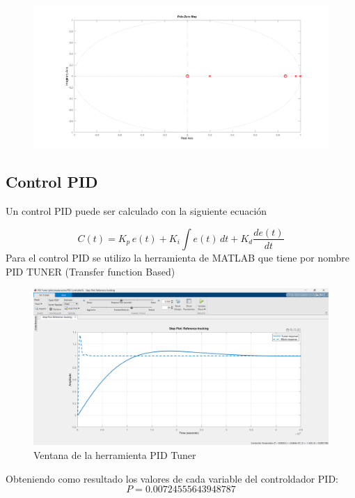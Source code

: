 \documentclass[12pt]{article}
\begin{document}
	\begin{figure} [h!]
		\centering
		\includegraphics[width=1\linewidth]{imagenes/Polos y ceros}
		\caption{}
		\label{polos y ceros}
	\end{figure}
	\newpage

	\subsection{Control PID}
	
	
	
	Un control PID puede ser calculado con la siguiente ecuación 
	
	\begin{equation}
		C(t) = K_p \, e(t) + K_i \int e(t) \, dt + K_d \frac{d e(t)}{dt}
	\end{equation}
	Para el control PID se utilizo la herramienta de MATLAB que tiene por nombre PID TUNER (Transfer function Based)
	
	\begin{figure}[h!]
		\centering
		\includegraphics[width=0.7\linewidth]{imagenes/pid tuner}
		\caption{Ventana de la herramienta PID Tuner}
		\label{fig:pid-tuner}
	\end{figure}
	
	Obteniendo como resultado los valores de cada variable del controldador PID:
	\begin{equation}
		P=0.00724555643948787 
	\end{equation}
	
\end{document}
